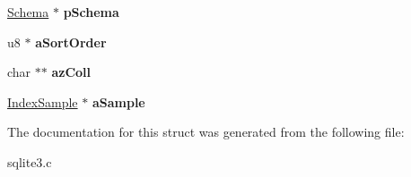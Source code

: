 \begin{DoxyCompactItemize}
\item 
\hypertarget{struct_index_af14f5ddd57eab2aba63dcb5db2aa92af}{\hyperlink{struct_schema}{Schema} $\ast$ {\bfseries p\-Schema}}\label{struct_index_af14f5ddd57eab2aba63dcb5db2aa92af}

\item 
\hypertarget{struct_index_a0a3fc87b53193995f59c9657443e9a99}{u8 $\ast$ {\bfseries a\-Sort\-Order}}\label{struct_index_a0a3fc87b53193995f59c9657443e9a99}

\item 
\hypertarget{struct_index_ab690ebb96c0329896b0fe2ab56813b88}{char $\ast$$\ast$ {\bfseries az\-Coll}}\label{struct_index_ab690ebb96c0329896b0fe2ab56813b88}

\item 
\hypertarget{struct_index_afa441de8beb041e894ce10665657c7cd}{\hyperlink{struct_index_sample}{Index\-Sample} $\ast$ {\bfseries a\-Sample}}\label{struct_index_afa441de8beb041e894ce10665657c7cd}

\end{DoxyCompactItemize}


The documentation for this struct was generated from the following file\-:\begin{DoxyCompactItemize}
\item 
sqlite3.\-c\end{DoxyCompactItemize}

